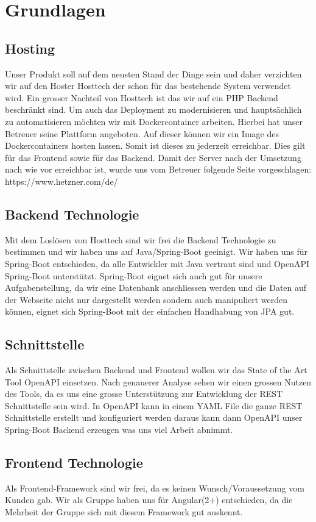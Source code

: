 \documentclass[../main.tex]{subfiles}
\begin{document}
	\section{Grundlagen}
	
	\subsection{Hosting}
	Unser Produkt soll auf dem neusten Stand der Dinge sein und daher verzichten wir auf den Hoster Hosttech der schon für das bestehende System verwendet wird. Ein grosser Nachteil von Hosttech ist das wir auf ein PHP Backend beschränkt sind. Um auch das Deployment zu modernisieren und hauptsächlich zu automatisieren möchten wir mit Dockercontainer arbeiten. Hierbei hat unser Betreuer seine Plattform angeboten. Auf dieser können wir ein Image des Dockercontainers hosten lassen. Somit ist dieses zu jederzeit erreichbar. Dies gilt für das Frontend sowie für das Backend.
	Damit der Server nach der Umsetzung nach wie vor erreichbar ist, wurde uns vom Betreuer folgende Seite vorgeschlagen: https://www.hetzner.com/de/
	
	\subsection{Backend Technologie}
	Mit dem Loslösen von Hosttech sind wir frei die Backend Technologie zu bestimmen und wir haben uns auf Java/Spring-Boot geeinigt. Wir haben uns für Spring-Boot entschieden, da alle Entwickler mit Java vertraut sind und OpenAPI Spring-Boot unterstützt. Spring-Boot eignet sich auch gut für unsere Aufgabenstellung, da wir eine Datenbank anschliessen werden und die Daten auf der Webseite nicht nur dargestellt werden sondern auch manipuliert werden können, eignet sich Spring-Boot mit der einfachen Handhabung von JPA gut.
	
	\subsection{Schnittstelle}
	Als Schnittstelle zwischen Backend und Frontend wollen wir das State of the Art Tool OpenAPI einsetzen. Nach genauerer Analyse sehen wir einen grossen Nutzen des Tools, da es uns eine grosse Unterstützung zur Entwicklung der REST Schnittstelle sein wird. In OpenAPI kann in einem YAML File die ganze REST Schnittstelle erstellt und konfiguriert werden daraus kann dann OpenAPI unser Spring-Boot Backend erzeugen was uns viel Arbeit abnimmt.
	
	\subsection{Frontend Technologie}
	Als Frontend-Framework sind wir frei, da es keinen Wunsch/Voraussetzung vom Kunden gab.
	Wir als Gruppe haben uns für Angular(2+) entschieden, da die Mehrheit der Gruppe sich mit diesem Framework gut auskennt. 
	
\end{document}
